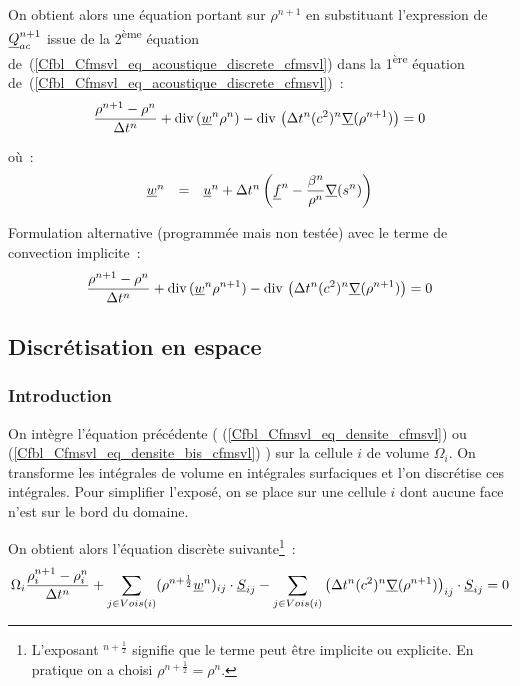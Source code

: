 On obtient alors une \'equation
portant sur $\rho^{n+1}$ en substituant l'expression de $\underline{Q}_{ac}^{n+1}$
issue de la 2\textsuperscript{\`eme} \'equation
de~(\ref{Cfbl_Cfmsvl_eq_acoustique_discrete_cfmsvl})
dans la 1\textsuperscript{\`ere} \'equation
de~(\ref{Cfbl_Cfmsvl_eq_acoustique_discrete_cfmsvl})~:
\begin{equation}\label{Cfbl_Cfmsvl_eq_densite_cfmsvl}
\displaystyle\frac{\rho^{n+1}-\rho^n}{\Delta t^n}
+\text{div}\,(\underline{w}^n \rho^n)
-\text{div}\,\left(\Delta t^n (c^2)^n \underline{\nabla}(\rho^{n+1})\right) = 0
\end{equation}

o\`u~:
\begin{equation}
\begin{array}{lll}
\underline{w}^n&=&  \underline{u}^n + \Delta t^n
\displaystyle\left(\underline{f}^n-\frac{\beta^n}{\rho^n}\underline{\nabla}(s^n)\right)
\end{array}
\end{equation}

Formulation alternative (programm\'ee mais non test\'ee)
avec le terme de convection implicite~:
\begin{equation}\label{Cfbl_Cfmsvl_eq_densite_bis_cfmsvl}
\displaystyle\frac{\rho^{n+1}-\rho^n}{\Delta t^n}
+\text{div}\,(\underline{w}^n \rho^{n+1})
-\text{div}\,\left(\Delta t^n (c^2)^n \underline{\nabla}(\rho^{n+1})\right) = 0
\end{equation}


\subsection*{Discr\'etisation en espace}


\subsubsection*{Introduction}

On int\`egre l'\'equation pr\'ec\'edente ( (\ref{Cfbl_Cfmsvl_eq_densite_cfmsvl})
ou (\ref{Cfbl_Cfmsvl_eq_densite_bis_cfmsvl}) ) sur la cellule $i$ de volume $\Omega_i$.
On transforme les int\'egrales de volume en int\'egrales surfaciques
et l'on discr\'etise ces int\'egrales. Pour simplifier l'exposé, on se
place sur une cellule $i$ dont aucune face n'est sur le bord du domaine.

On obtient alors l'\'equation discr\`ete
suivante\footnote{L'exposant $^{n+\frac{1}{2}}$ signifie que le terme
peut \^etre implicite ou explicite. En pratique on a choisi
$\rho^{n+\frac{1}{2}} = \rho^{n}$.}~:
\begin{equation}\label{Cfbl_Cfmsvl_eq_densite_discrete_cfmsvl}
\Omega_i \displaystyle\frac{\rho_i^{n+1}-\rho_i^n}{\Delta t^n}
+\sum\limits_{j\in Vois(i)}(\rho^{n+\frac{1}{2}} \underline{w}^n)_{ij} \cdot \underline{S}_{ij}
-\sum\limits_{j\in Vois(i)} \left(\Delta t^n (c^2)^n
\underline{\nabla}(\rho^{n+1})\right)_{ij} \cdot \underline{S}_{ij}
= 0
\end{equation}

